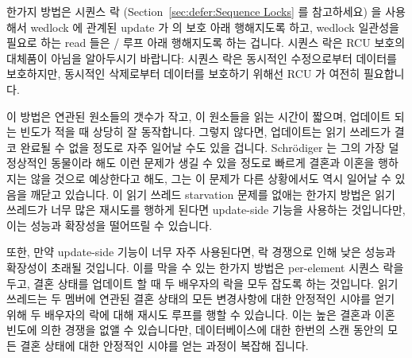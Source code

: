 한가지 방법은 시퀀스 락
(Section~\ref{sec:defer:Sequence Locks} 를 참고하세요) 을 사용해서 wedlock 에
관계된 update 가  의 보호 아래 행해지도록 하고, wedlock
일관성을 필요로 하는 read 들은  /  루프
아래 행해지도록 하는 겁니다.
시퀀스 락은 RCU 보호의 대체품이 아님을 알아두시기 바랍니다:
시퀀스 락은 동시적인 수정으로부터 데이터를 보호하지만, 동시적인 삭제로부터
데이터를 보호하기 위해선 RCU 가 여전히 필요합니다.

이 방법은 연관된 원소들의 갯수가 작고, 이 원소들을 읽는 시간이 짧으며, 업데이트
되는 빈도가 적을 때 상당히 잘 동작합니다.
그렇지 않다면, 업데이트는 읽기 쓰레드가 결코 완료될 수 없을 정도로 자주 일어날
수도 있을 겁니다.
Schr\"odiger 는 그의 가장 덜 정상적인 동물이라 해도 이런 문제가 생길 수 있을
정도로 빠르게 결혼과 이혼을 행하지는 않을 것으로 예상한다고 해도, 그는 이
문제가 다른 상황에서도 역시 일어날 수 있음을 깨닫고 있습니다.
이 읽기 쓰레드 starvation 문제를 없애는 한가지 방법은 읽기 쓰레드가 너무 많은
재시도를 행하게 된다면 update-side 기능을 사용하는 것입니다만, 이는 성능과
확장성을 떨어뜨릴 수 있습니다.
\iffalse

One approach is to use sequence locks
(see Section~\ref{sec:defer:Sequence Locks}),
so that wedlock-related updates are carried out under the
protection of \co{write_seqlock()}, while reads requiring
wedlock consistency are carried out within
a \co{read_seqbegin()} / \co{read_seqretry()} loop.
Note that sequence locks are not a replacement for RCU protection:
Sequence locks protect against concurrent modifications, but RCU
is still needed to protect against concurrent deletions.

This approach works quite well when the number of correlated elements is
small, the time to read these elements is short, and the update rate is
low.
Otherwise, updates might happen so quickly that readers might never complete.
Although Schr\"odinger does not expect that even his least-sane relatives
will marry and divorce quickly enough for this to be a problem,
he does realize that this problem could well arise in other situations.
One way to avoid this reader-starvation problem is to have the readers
use the update-side primitives if there have been too many retries,
but this can degrade both performance and scalability.
\fi

또한, 만약 update-side 기능이 너무 자주 사용된다면, 락 경쟁으로 인해 낮은
성능과 확장성이 초래될 것입니다.
이를 막을 수 있는 한가지 방법은 per-element 시퀀스 락을 두고, 결혼 상태를
업데이트 할 때 두 배우자의 락을 모두 잡도록 하는 것입니다.
읽기 쓰레드는 두 멤버에 연관된 결혼 상태의 모든 변경사항에 대한 안정적인 시야를
얻기 위해 두 배우자의 락에 대해 재시도 루프를 행할 수 있습니다.
이는 높은 결혼과 이혼 빈도에 의한 경쟁을 없앨 수 있습니다만, 데이터베이스에
대한 한번의 스캔 동안의 모든 결혼 상태에 대한 안정적인 시야를 얻는 과정이
복잡해 집니다.
\iffalse

